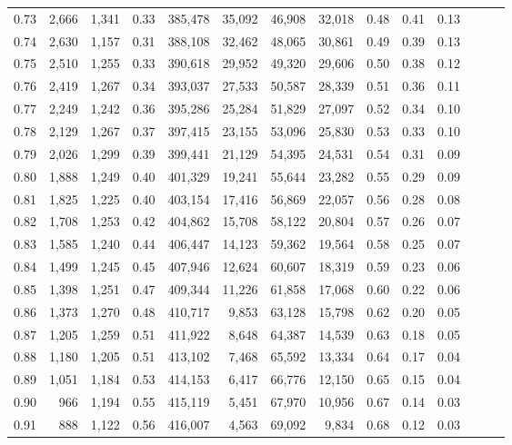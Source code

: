 \begin{tabular}{rrrrrrrrrrrrrr}
0.73 &  2,666 &  1,341 &  0.33 &  385,478 &   35,092 &  46,908 &  32,018 &  0.48 &  0.41 &      0.13 \\
0.74 &  2,630 &  1,157 &  0.31 &  388,108 &   32,462 &  48,065 &  30,861 &  0.49 &  0.39 &      0.13 \\
0.75 &  2,510 &  1,255 &  0.33 &  390,618 &   29,952 &  49,320 &  29,606 &  0.50 &  0.38 &      0.12 \\
0.76 &  2,419 &  1,267 &  0.34 &  393,037 &   27,533 &  50,587 &  28,339 &  0.51 &  0.36 &      0.11 \\
0.77 &  2,249 &  1,242 &  0.36 &  395,286 &   25,284 &  51,829 &  27,097 &  0.52 &  0.34 &      0.10 \\
0.78 &  2,129 &  1,267 &  0.37 &  397,415 &   23,155 &  53,096 &  25,830 &  0.53 &  0.33 &      0.10 \\
0.79 &  2,026 &  1,299 &  0.39 &  399,441 &   21,129 &  54,395 &  24,531 &  0.54 &  0.31 &      0.09 \\
0.80 &  1,888 &  1,249 &  0.40 &  401,329 &   19,241 &  55,644 &  23,282 &  0.55 &  0.29 &      0.09 \\
0.81 &  1,825 &  1,225 &  0.40 &  403,154 &   17,416 &  56,869 &  22,057 &  0.56 &  0.28 &      0.08 \\
0.82 &  1,708 &  1,253 &  0.42 &  404,862 &   15,708 &  58,122 &  20,804 &  0.57 &  0.26 &      0.07 \\
0.83 &  1,585 &  1,240 &  0.44 &  406,447 &   14,123 &  59,362 &  19,564 &  0.58 &  0.25 &      0.07 \\
0.84 &  1,499 &  1,245 &  0.45 &  407,946 &   12,624 &  60,607 &  18,319 &  0.59 &  0.23 &      0.06 \\
0.85 &  1,398 &  1,251 &  0.47 &  409,344 &   11,226 &  61,858 &  17,068 &  0.60 &  0.22 &      0.06 \\
0.86 &  1,373 &  1,270 &  0.48 &  410,717 &    9,853 &  63,128 &  15,798 &  0.62 &  0.20 &      0.05 \\
0.87 &  1,205 &  1,259 &  0.51 &  411,922 &    8,648 &  64,387 &  14,539 &  0.63 &  0.18 &      0.05 \\
0.88 &  1,180 &  1,205 &  0.51 &  413,102 &    7,468 &  65,592 &  13,334 &  0.64 &  0.17 &      0.04 \\
0.89 &  1,051 &  1,184 &  0.53 &  414,153 &    6,417 &  66,776 &  12,150 &  0.65 &  0.15 &      0.04 \\
0.90 &    966 &  1,194 &  0.55 &  415,119 &    5,451 &  67,970 &  10,956 &  0.67 &  0.14 &      0.03 \\
0.91 &    888 &  1,122 &  0.56 &  416,007 &    4,563 &  69,092 &   9,834 &  0.68 &  0.12 &      0.03 \\

\end{tabular}
